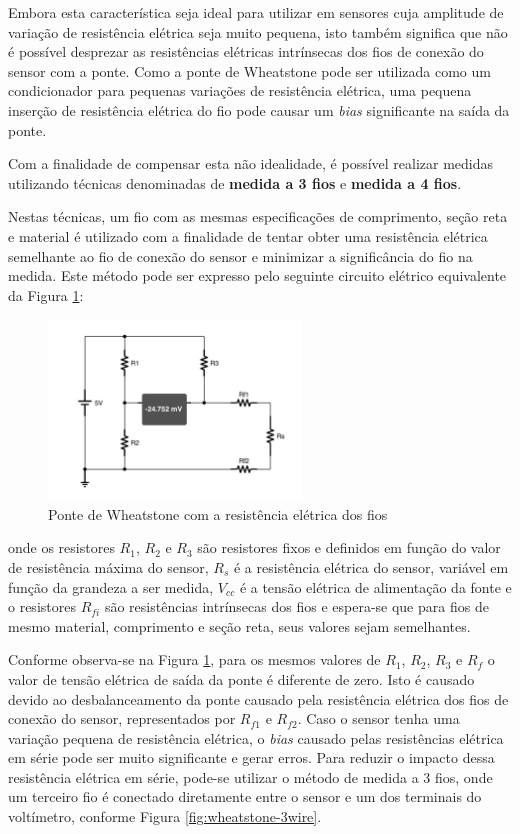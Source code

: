 \documentclass[a4paper]{instrumentacao}
\begin{document}
Embora esta característica seja ideal para utilizar em sensores cuja amplitude de variação de resistência elétrica seja muito pequena, isto também significa que não é possível desprezar as resistências elétricas intrínsecas dos fios de conexão do sensor com a ponte. Como a ponte de Wheatstone pode ser utilizada como um condicionador para pequenas variações de resistência elétrica, uma pequena inserção de resistência elétrica do fio pode causar um \textit{bias} significante na saída da ponte.

Com a finalidade de compensar esta não idealidade, é possível realizar medidas utilizando técnicas denominadas de \textbf{medida a 3 fios} e \textbf{medida a 4 fios}.

Nestas técnicas, um fio com as mesmas especificações de comprimento, seção reta e material é utilizado com a finalidade de tentar obter uma resistência elétrica semelhante ao fio de conexão do sensor e minimizar a significância do fio na medida. Este método pode ser expresso pelo seguinte circuito elétrico equivalente da Figura \ref{fig:wheatstone-wire-model}:

\begin{figure}[H]
\centering
\includegraphics[width=0.6\textwidth]{Wheatstone-Bridge-WiresModel.pdf}
\caption{Ponte de Wheatstone com a resistência elétrica dos fios}
\label{fig:wheatstone-wire-model}
\end{figure}

\noindent onde os resistores $R_1$, $R_2$ e $R_3$ são resistores fixos e definidos em função do valor de resistência máxima do sensor, $R_s$ é a resistência elétrica do sensor, variável em função da grandeza a ser medida, $V_{cc}$ é a tensão elétrica de alimentação da fonte e o resistores $R_{fi}$ são resistências intrínsecas dos fios e espera-se que para fios de mesmo material, comprimento e seção reta, seus valores sejam semelhantes.

Conforme observa-se na Figura \ref{fig:wheatstone-wire-model}, para os mesmos valores de $R_1$, $R_2$, $R_3$ e $R_f$ o valor de tensão elétrica de saída da ponte é diferente de zero. Isto é causado devido ao desbalanceamento da ponte causado pela resistência elétrica dos fios de conexão do sensor, representados por $R_{f1}$ e $R_{f2}$. Caso o sensor tenha uma variação pequena de resistência elétrica, o \textit{bias} causado pelas resistências elétrica em série pode ser muito significante e gerar erros. Para reduzir o impacto dessa resistência elétrica em série, pode-se utilizar o método de medida a 3 fios, onde um terceiro fio é conectado diretamente entre o sensor e um dos terminais do voltímetro, conforme Figura \ref{fig:wheatstone-3wire}.
\end{document}
